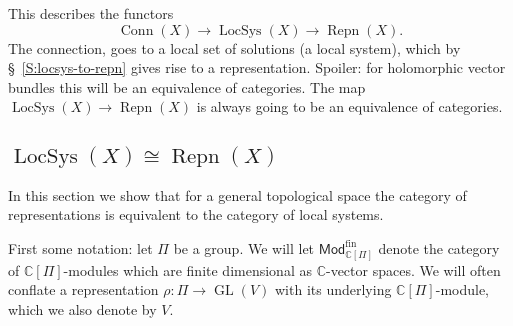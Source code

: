 \documentclass[12pt]{book}
\numberwithin{equation}{section}
\theoremstyle{definition}
\theoremstyle{remark}
\newcommand{\CC}{\mathbb{C}}
\newcommand{\GL}{\operatorname{GL}}
\newcommand{\LocSys}{\operatorname{LocSys}}
\newcommand{\Mod}{\mathsf{Mod}}
\newcommand{\fin}{\operatorname{fin}}
\newcommand{\Conn}{\operatorname{Conn}}
\newcommand{\Repn}{\operatorname{Repn}}
\begin{document}
This describes the functors
 $$ \Conn(X) \to \LocSys(X) \to \Repn(X).$$
The connection, goes to a local set of solutions (a local system), which by \S~\ref{S:locsys-to-repn} gives rise to a representation. 
Spoiler: for holomorphic vector bundles this will be an equivalence of categories. 
The map $\LocSys(X) \to \Repn(X)$ is always going to be an equivalence of categories. 


\subsection{$\LocSys(X) \cong \Repn(X)$}\label{S:locsys-repn}
In this section we show that for a general topological space the category of representations is equivalent to the category of local systems. 

First some notation: let $\Pi$ be a group. 
We will let $\Mod^{\fin}_{\CC[\Pi]}$ denote the category of $\CC[\Pi]$-modules which are finite dimensional as $\CC$-vector spaces. 
We will often conflate a representation $\rho: \Pi \to \GL(V)$ with its underlying  $\CC[\Pi]$-module, which we also denote by $V$.  
\end{document}
